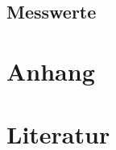\documentclass[11pt,a4paper]{article}
\begin{document}
	
	
	
	
	
	
	
	
	
	
	
	
	
	
\subsection{Messwerte}



\newpage
\section{Anhang}
%

\nocite{*}
\newpage
\section{Literatur}
\newpage
%
\end{document}
